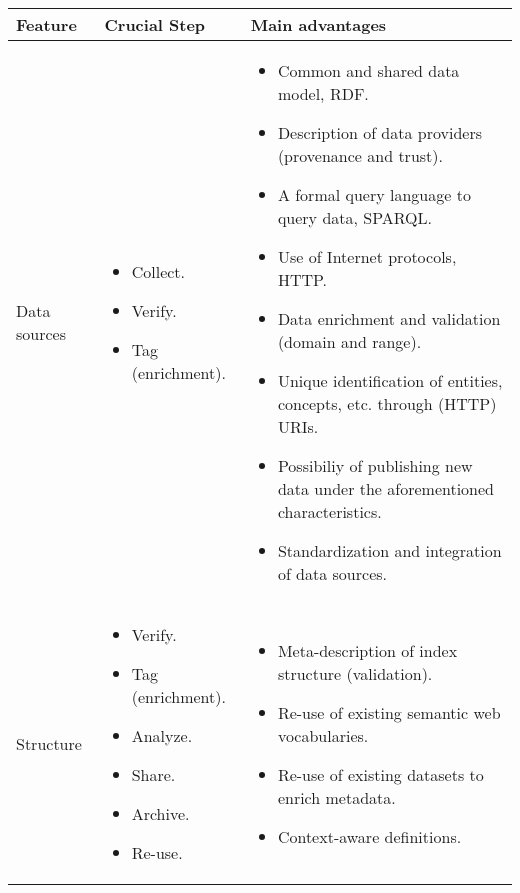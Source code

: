  
\begin{table}[!htb]
\renewcommand{\arraystretch}{1.3}
\begin{center}
\begin{tabular}{|p{3cm}|p{3.5cm}|p{6.5cm}|}
\hline
  \textbf{Feature} & \textbf{Crucial Step} &\textbf{Main advantages}  \\  \hline
  Data sources &  \begin{itemize} \item Collect. \item Verify. \item Tag (enrichment).\end{itemize} & \begin{itemize}
		      \item Common and shared data model, RDF.
		      \item Description of data providers (provenance and trust).
		      \item A formal query language to query data, SPARQL.
		      \item Use of Internet protocols, HTTP.
		      \item Data enrichment and validation (domain and range).
		      \item Unique identification of entities, concepts, etc. through (HTTP) URIs.
		      \item Possibiliy of publishing new data under the aforementioned characteristics.
		      \item Standardization and integration of data sources.
		    \end{itemize} \\ \hline  
  Structure & \begin{itemize} \item Verify. \item Tag (enrichment). \item Analyze. \item Share. \item Archive. \item Re-use. \end{itemize} & \begin{itemize}
                  \item Meta-description of index structure (validation).
                  \item Re-use of existing semantic web vocabularies.
                  \item Re-use of existing datasets to enrich metadata.
                  \item Context-aware definitions.

\end{itemize}
\end{tabular}
\end{center}
\end{table}
